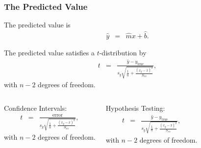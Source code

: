 \begin{frame}
  \frametitle{The Predicted Value}

  The predicted value is 
  \begin{eqnarray*}
    \hat{y} & = & \hat{m} x + \hat{b}.
  \end{eqnarray*}


  The predicted value  satisfies a $t$-distribution by
  \begin{eqnarray*}
    t & = & \frac{\hat{y}-y_{\mathrm{true}}}{s_y \sqrt{\frac{1}{n}+\frac{(x_y-\bar{x})^2}{S_{xx}}}},
  \end{eqnarray*}
  with $n-2$ degrees of freedom.

  {

    \begin{columns}

      Confidence Intervals:
      \begin{eqnarray*}
        t & = & \frac{\mathrm{error}}{s_y \sqrt{\frac{1}{n}+\frac{(x_y-\bar{x})^2}{S_{xx}}}},
      \end{eqnarray*}
      with $n-2$ degrees of freedom.


      Hypothesis Testing:
      \begin{eqnarray*}
        t & = & \frac{\hat{y}-y_{\mathrm{true}}}{s_y \sqrt{\frac{1}{n}+\frac{(x_y-\bar{x})^2}{S_{xx}}}},
      \end{eqnarray*}
      with $n-2$ degrees of freedom.

    
    \end{columns}
  }


\end{frame}


